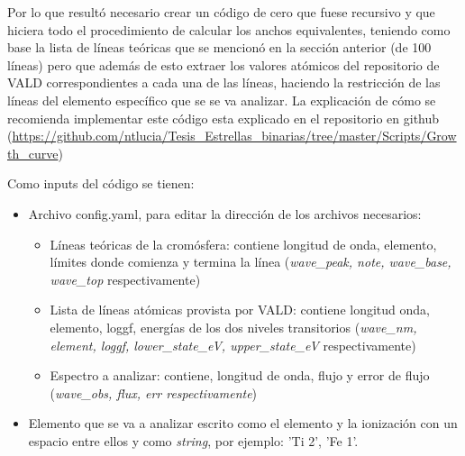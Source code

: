 \documentclass[12pt,oneside,openany,letter]{book}
\begin{document}
Por lo que resultó necesario crear un código de cero que fuese recursivo y que hiciera todo el procedimiento de calcular los anchos equivalentes, teniendo como base la lista de líneas teóricas que se mencionó en la sección anterior (de 100 líneas)
pero que además de esto extraer los valores atómicos del repositorio de VALD correspondientes a cada una de las líneas, haciendo la restricción de las líneas del elemento específico que se se va analizar. La explicación de cómo se recomienda implementar este código esta explicado en el repositorio en github (\url{https://github.com/ntlucia/Tesis_Estrellas_binarias/tree/master/Scripts/Growth_curve})

Como inputs del código se tienen:
\begin{itemize}
    \item Archivo config.yaml, para editar la dirección de los archivos necesarios:
    \begin{itemize}
        \item Líneas teóricas de la cromósfera: contiene longitud de onda, elemento, límites donde comienza y termina la línea (\textit{wave\_peak, note, wave\_base, wave\_top} respectivamente)
        \item Lista de líneas atómicas provista por VALD: contiene longitud onda, elemento, loggf, energías de los dos niveles transitorios (\textit{wave\_nm, element, loggf, lower\_state\_eV, upper\_state\_eV} respectivamente)
        \item Espectro a analizar: contiene, longitud de onda, flujo y error de flujo (\textit{wave\_obs, flux, err respectivamente})
    \end{itemize}
    \item Elemento que se va a analizar escrito como el elemento y la ionización con un espacio entre ellos y como \textit{string}, por ejemplo: 'Ti 2', 'Fe 1'.
\end{itemize}
\end{document}
